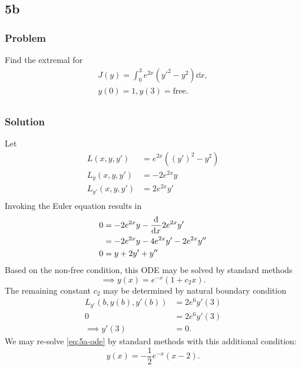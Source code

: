 \documentclass[12pt,twoside]{article}
\begin{document}
\subsection{5b}
\subsubsection*{Problem}
Find the extremal for
\begin{equation}
  \label{eq:5a-problem}
  \begin{aligned}
    J(y) = \int_0^3 e^{2x}(y'^2-y^2)\dd{x}, \\
    y(0)=1, y(3)=\text{free}. \\
  \end{aligned}
\end{equation}

\subsubsection*{Solution}
Let
\begin{align*}
  L(x,y,y') &= e^{2 x} \left({\left(y'\right)}^2-y^2\right) \\
  L_y(x,y,y') &= -2 e^{2 x} y \\
  L_{y'}(x,y,y') &= 2 e^{2 x} y' \\
\end{align*}
Invoking the Euler equation results in
\begin{equation}
\label{eq:5a-ode}
\begin{aligned}
  0 &= -2 e^{2 x} y - \frac{\mathrm{d}^{} {}}{\mathrm{d}{x}^{}}2 e^{2 x} y' \\
    &= -2 e^{2 x} y - 4e^{2x}y' - 2e^{2x}y'' \\
  0 &= y + 2y' + y''
\end{aligned}
\end{equation}
Based on the non-free condition, this ODE may be solved by standard methods
\begin{equation*}
  \implies y(x) = e^{-x}(1+c_2x).
\end{equation*}
The remaining constant $c_2$ may be determined by natural boundary condition
\begin{align*}
  L_{y'}(b,y(b),y'(b)) &= 2 e^{6} y'(3) \\
  0 &= 2e^{6}y'(3) \\
  \implies y'(3) &= 0.
\end{align*}
We may re-solve \cref{eq:5a-ode} by standard methods with this additional
condition:
\begin{equation*}
  \boxed{y(x) = -\frac{1}{2} e^{-x} (x-2).}
\end{equation*}
\end{document}
